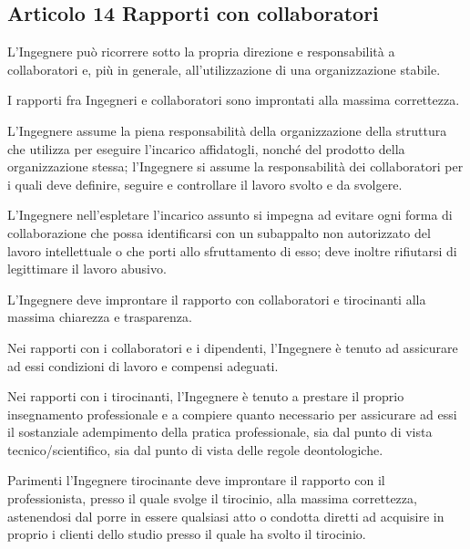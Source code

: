 \documentclass[letterpaper,10pt,italian]{sphinxmanual}
\begin{document}
\subsection{Articolo 14 \sphinxhyphen{} Rapporti con collaboratori}
\label{\detokenize{capitoli/codice/codice_deontologico:articolo-14-rapporti-con-collaboratori}}\begin{description}
\sphinxAtStartPar
L’Ingegnere può ricorrere sotto la propria direzione e responsabilità a collaboratori e, più in generale, all’utilizzazione di una organizzazione stabile.

\sphinxAtStartPar
I rapporti fra Ingegneri e collaboratori sono improntati alla massima correttezza.

\sphinxAtStartPar
L’Ingegnere assume la piena responsabilità della organizzazione della struttura che utilizza per eseguire l’incarico affidatogli, nonché del prodotto della organizzazione stessa; l’Ingegnere si assume la responsabilità dei collaboratori per i quali deve definire, seguire e controllare il lavoro svolto e da svolgere.

\sphinxAtStartPar
L’Ingegnere nell’espletare l’incarico assunto si impegna ad evitare ogni forma di collaborazione che possa identificarsi con un subappalto non autorizzato del lavoro intellettuale o che porti allo sfruttamento di esso; deve inoltre rifiutarsi di legittimare il lavoro abusivo.

\sphinxAtStartPar
L’Ingegnere deve improntare il rapporto con collaboratori e tirocinanti alla massima chiarezza e trasparenza.

\sphinxAtStartPar
Nei rapporti con i collaboratori e i dipendenti, l’Ingegnere è tenuto ad assicurare ad essi condizioni di lavoro e compensi adeguati.

\sphinxAtStartPar
Nei rapporti con i tirocinanti, l’Ingegnere è tenuto a prestare il proprio insegnamento professionale e a compiere quanto necessario per assicurare ad essi il sostanziale adempimento della pratica professionale, sia dal punto di vista tecnico/scientifico, sia dal punto di vista delle regole deontologiche.

\sphinxAtStartPar
Parimenti l’Ingegnere tirocinante deve improntare il rapporto con il professionista, presso il quale svolge il tirocinio, alla massima correttezza, astenendosi dal porre in essere qualsiasi atto o condotta diretti ad acquisire in proprio i clienti dello studio presso il quale ha svolto il tirocinio.

\end{description}
\end{document}
